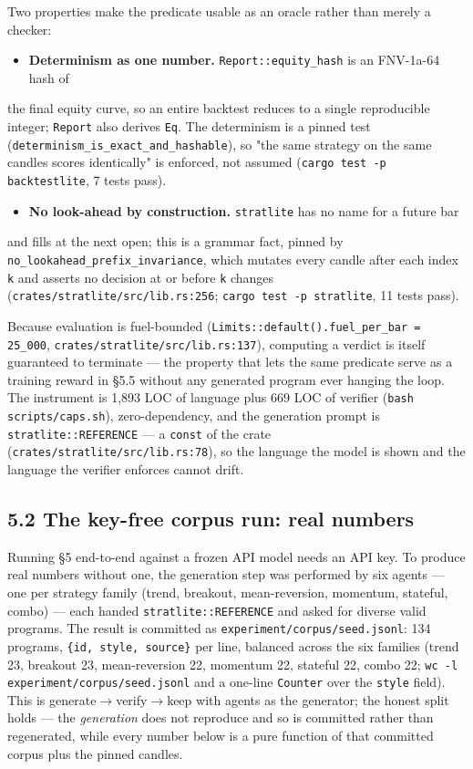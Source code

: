 \documentclass[11pt]{article}
\newcommand{\code}[1]{\texttt{#1}}
\begin{document}
Two properties make the predicate usable as an oracle rather than merely a
checker:

\begin{itemize}[leftmargin=*]
\item \textbf{Determinism as one number.} \code{Report::equity\_hash} is an FNV-1a-64 hash of
\end{itemize}
  the final equity curve, so an entire backtest reduces to a single reproducible
  integer; \code{Report} also derives \code{Eq}. The determinism is a pinned test
  (\code{determinism\_is\_exact\_and\_hashable}), so "the same strategy on the same
  candles scores identically" is enforced, not assumed
  (\code{cargo test -p backtestlite}, 7 tests pass).
\begin{itemize}[leftmargin=*]
\item \textbf{No look-ahead by construction.} \code{stratlite} has no name for a future bar
\end{itemize}
  and fills at the next open; this is a grammar fact, pinned by
  \code{no\_lookahead\_prefix\_invariance}, which mutates every candle after each index
  \code{k} and asserts no decision at or before \code{k} changes
  (\code{crates/stratlite/src/lib.rs:256}; \code{cargo test -p stratlite}, 11 tests pass).

Because evaluation is fuel-bounded (\code{Limits::default().fuel\_per\_bar = 25\_000},
\code{crates/stratlite/src/lib.rs:137}), computing a verdict is itself guaranteed to
terminate --- the property that lets the same predicate serve as a training reward
in \S{}5.5 without any generated program ever hanging the loop. The instrument is
1,893 LOC of language plus 669 LOC of verifier (\code{bash scripts/caps.sh}),
zero-dependency, and the generation prompt is \code{stratlite::REFERENCE} --- a \code{const}
of the crate (\code{crates/stratlite/src/lib.rs:78}), so the language the model is
shown and the language the verifier enforces cannot drift.

\subsection*{5.2 The key-free corpus run: real numbers}

Running \S{}5 end-to-end against a frozen API model needs an API key. To produce
real numbers without one, the generation step was performed by six agents --- one
per strategy family (trend, breakout, mean-reversion, momentum, stateful,
combo) --- each handed \code{stratlite::REFERENCE} and asked for diverse valid
programs. The result is committed as \code{experiment/corpus/seed.jsonl}: 134
programs, \code{\{id, style, source\}} per line, balanced across the six families
(trend 23, breakout 23, mean-reversion 22, momentum 22, stateful 22, combo 22;
\code{wc -l experiment/corpus/seed.jsonl} and a one-line \code{Counter} over the \code{style}
field). This is generate$\rightarrow$verify$\rightarrow$keep with agents as the generator; the honest
split holds --- the \emph{generation} does not reproduce and so is committed rather than
regenerated, while every number below is a pure function of that committed
corpus plus the pinned candles.
\end{document}
